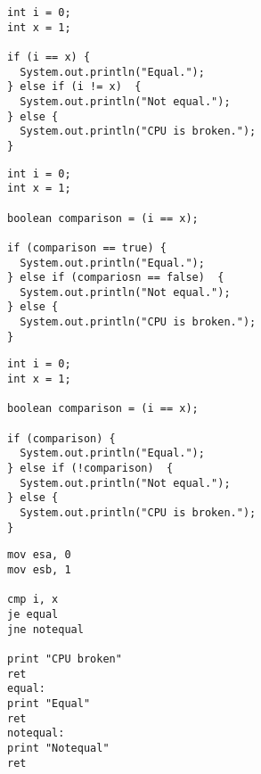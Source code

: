 \documentclass{beamer}
\begin{document}
\begin{frame}[fragile]{\subsecname}
  \begin{lstlisting}
int i = 0;
int x = 1;

if (i == x) {
  System.out.println("Equal.");
} else if (i != x)  {
  System.out.println("Not equal.");
} else {
  System.out.println("CPU is broken.");
}
  \end{lstlisting}
\end{frame}

\begin{frame}[fragile]{\subsecname}
  \begin{lstlisting}
int i = 0;
int x = 1;

boolean comparison = (i == x);

if (comparison == true) {
  System.out.println("Equal.");
} else if (compariosn == false)  {
  System.out.println("Not equal.");
} else {
  System.out.println("CPU is broken.");
}
  \end{lstlisting}
\end{frame}

\begin{frame}[fragile]{\subsecname}
  \begin{lstlisting}
int i = 0;
int x = 1;

boolean comparison = (i == x);

if (comparison) {
  System.out.println("Equal.");
} else if (!comparison)  {
  System.out.println("Not equal.");
} else {
  System.out.println("CPU is broken.");
}
  \end{lstlisting}
\end{frame}

\begin{frame}[fragile]{\subsecname}
  \begin{lstlisting}
mov esa, 0
mov esb, 1

cmp i, x
je equal
jne notequal

print "CPU broken"
ret
equal:
print "Equal"
ret
notequal:
print "Notequal"
ret

  \end{lstlisting}
\end{frame}
\end{document}
